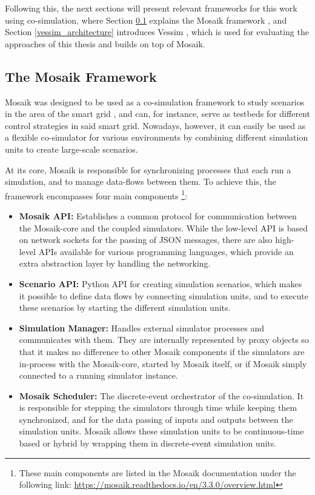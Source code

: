 Following this, the next sections will present relevant frameworks for this work using co-simulation, where Section \ref{mosaik_framework} explains the Mosaik framework \cite{mosaik}, and Section \ref{vessim_architecture} introduces Vessim \cite{vessim}, which is used for evaluating the approaches of this thesis and builds on top of Mosaik.

\subsection{The Mosaik Framework}
\label{mosaik_framework}
Mosaik \cite{mosaik} was designed to be used as a co-simulation framework to study scenarios in the area of the smart grid \cite{Smart-Grids}, and can, for instance, serve as testbeds for different control strategies in said smart grid. Nowadays, however, it can easily be used as a flexible co-simulator for various environments by combining different simulation units to create large-scale scenarios.

At its core, Mosaik is responsible for synchronizing processes that each run a simulation, and to manage data-flows between them. To achieve this, the framework encompasses four main components \footnote{These main components are listed in the Mosaik documentation under the following link: \url{https://mosaik.readthedocs.io/en/3.3.0/overview.html}}:
\begin{itemize}
    \item[] \textbf{Mosaik API:} Establishes a common protocol for communication between the Mosaik-core and the coupled simulators. While the low-level API is based on network sockets for the passing of JSON messages, there are also high-level APIs available for various programming languages, which provide an extra abstraction layer by handling the networking.
    \item[] \textbf{Scenario API:} Python API for creating simulation scenarios, which makes it possible to define data flows by connecting simulation units, and to execute these scenarios by starting the different simulation units. 
    \item[] \textbf{Simulation Manager:} Handles external simulator processes and communicates with them. They are internally represented by proxy objects so that it makes no difference to other Mosaik components if the simulators are in-process with the Mosaik-core, started by Mosaik itself, or if Mosaik simply connected to a running simulator instance.
    \item[] \textbf{Mosaik Scheduler:} The discrete-event orchestrator of the co-simulation. It is responsible for stepping the simulators through time while keeping them synchronized, and for the data passing of inputs and outputs between the simulation units. Mosaik allows these simulation units to be continuous-time based or hybrid by wrapping them in discrete-event simulation units.
\end{itemize}

